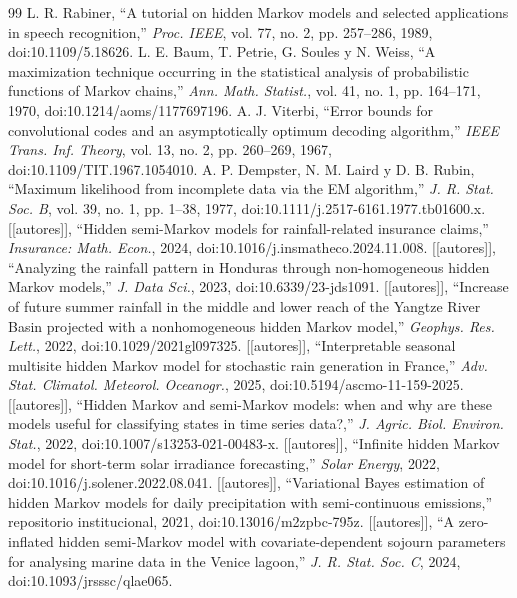 \documentclass[11pt,letterpaper]{article}
\newcommand{\pend}[1]{\textcolor{red!70!black}{[#1]}}
\begin{document}
\begin{thebibliography}{99}\small
{} L. R. Rabiner, ``A tutorial on hidden Markov models and selected applications in speech recognition,'' \emph{Proc. IEEE}, vol. 77, no. 2, pp. 257--286, 1989, doi:10.1109/5.18626.
 L. E. Baum, T. Petrie, G. Soules y N. Weiss, ``A maximization technique occurring in the statistical analysis of probabilistic functions of Markov chains,'' \emph{Ann. Math. Statist.}, vol. 41, no. 1, pp. 164--171, 1970, doi:10.1214/aoms/1177697196.
 A. J. Viterbi, ``Error bounds for convolutional codes and an asymptotically optimum decoding algorithm,'' \emph{IEEE Trans. Inf. Theory}, vol. 13, no. 2, pp. 260--269, 1967, doi:10.1109/TIT.1967.1054010.
 A. P. Dempster, N. M. Laird y D. B. Rubin, ``Maximum likelihood from incomplete data via the EM algorithm,'' \emph{J. R. Stat. Soc. B}, vol. 39, no. 1, pp. 1--38, 1977, doi:10.1111/j.2517-6161.1977.tb01600.x.
 \pend{[autores]}, ``Hidden semi-Markov models for rainfall-related insurance claims,'' \emph{Insurance: Math. Econ.}, 2024, doi:10.1016/j.insmatheco.2024.11.008.
 \pend{[autores]}, ``Analyzing the rainfall pattern in Honduras through non-homogeneous hidden Markov models,'' \emph{J. Data Sci.}, 2023, doi:10.6339/23-jds1091.
 \pend{[autores]}, ``Increase of future summer rainfall in the middle and lower reach of the Yangtze River Basin projected with a nonhomogeneous hidden Markov model,'' \emph{Geophys. Res. Lett.}, 2022, doi:10.1029/2021gl097325.
 \pend{[autores]}, ``Interpretable seasonal multisite hidden Markov model for stochastic rain generation in France,'' \emph{Adv. Stat. Climatol. Meteorol. Oceanogr.}, 2025, doi:10.5194/ascmo-11-159-2025.
 \pend{[autores]}, ``Hidden Markov and semi-Markov models: when and why are these models useful for classifying states in time series data?,'' \emph{J. Agric. Biol. Environ. Stat.}, 2022, doi:10.1007/s13253-021-00483-x.
 \pend{[autores]}, ``Infinite hidden Markov model for short-term solar irradiance forecasting,'' \emph{Solar Energy}, 2022, doi:10.1016/j.solener.2022.08.041.
 \pend{[autores]}, ``Variational Bayes estimation of hidden Markov models for daily precipitation with semi-continuous emissions,'' repositorio institucional, 2021, doi:10.13016/m2zpbc-795z.
 \pend{[autores]}, ``A zero-inflated hidden semi-Markov model with covariate-dependent sojourn parameters for analysing marine data in the Venice lagoon,'' \emph{J. R. Stat. Soc. C}, 2024, doi:10.1093/jrsssc/qlae065.

\end{thebibliography}
\end{document}
